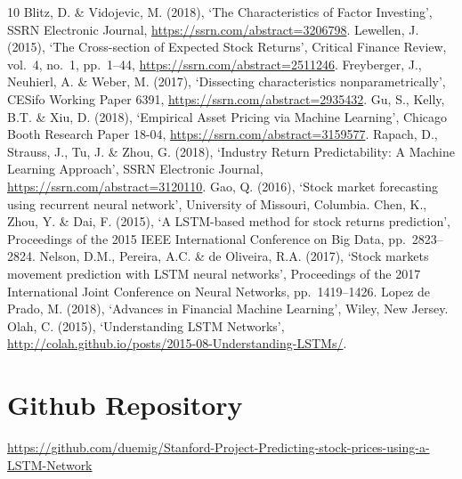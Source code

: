 \documentclass[10pt]{article}
\begin{document}
\begin{thebibliography}{10}
\small
{} Blitz, D. \& Vidojevic, M. (2018), `The Characteristics of Factor Investing', SSRN Electronic Journal, \url{https://ssrn.com/abstract=3206798}.
 Lewellen, J. (2015), `The Cross-section of Expected Stock Returns', Critical Finance Review, vol.~4, no.~1, pp.~1--44, \url{https://ssrn.com/abstract=2511246}.
 Freyberger, J., Neuhierl, A. \& Weber, M. (2017), `Dissecting characteristics nonparametrically', CESifo Working Paper 6391, \url{https://ssrn.com/abstract=2935432}.
 Gu, S., Kelly, B.T. \& Xiu, D. (2018), `Empirical Asset Pricing via Machine Learning', Chicago Booth Research Paper 18-04, \url{https://ssrn.com/abstract=3159577}.
 Rapach, D., Strauss, J., Tu, J. \& Zhou, G. (2018), `Industry Return Predictability: A Machine Learning Approach', SSRN Electronic Journal, \url{https://ssrn.com/abstract=3120110}.
 Gao, Q. (2016), `Stock market forecasting using recurrent neural network', University of Missouri, Columbia.
 Chen, K., Zhou, Y. \& Dai, F. (2015), `A LSTM-based method for stock returns prediction', Proceedings of the 2015 IEEE International Conference on Big Data, pp.~2823--2824.
 Nelson, D.M., Pereira, A.C. \& de Oliveira, R.A. (2017), `Stock markets movement prediction with LSTM neural networks', Proceedings of the 2017 International Joint Conference on Neural Networks, pp.~1419--1426.
 Lopez de Prado, M. (2018), `Advances in Financial Machine Learning', Wiley, New Jersey.
 Olah, C. (2015), `Understanding LSTM Networks', \url{http://colah.github.io/posts/2015-08-Understanding-LSTMs/}.
\end{thebibliography}

\section*{Github Repository}

{\small\sloppy\url{https://github.com/duemig/Stanford-Project-Predicting-stock-prices-using-a-LSTM-Network}\par}
\end{document}
